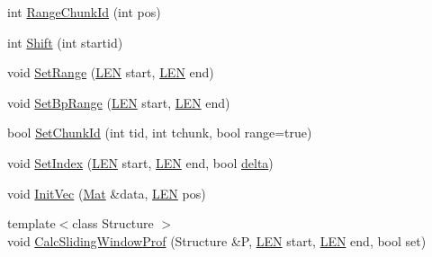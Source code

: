 \begin{DoxyCompactItemize}
int \hyperlink{class_rfold_1_1_paraso_r_ac14656436548df4306ef387bda5a0152}{Range\+Chunk\+Id} (int pos)
\item 
int \hyperlink{class_rfold_1_1_paraso_r_ac3515afcf36abba4a21548172138a784}{Shift} (int startid)
\item 
void \hyperlink{class_rfold_1_1_paraso_r_a84862289410d1791da040db720a4b4fa}{Set\+Range} (\hyperlink{energy__const_8hh_a05b49c662c073f89e86804f7856622a0}{L\+E\+N} start, \hyperlink{energy__const_8hh_a05b49c662c073f89e86804f7856622a0}{L\+E\+N} end)
\item 
void \hyperlink{class_rfold_1_1_paraso_r_a957949c0106b4f407f721c276495f36f}{Set\+Bp\+Range} (\hyperlink{energy__const_8hh_a05b49c662c073f89e86804f7856622a0}{L\+E\+N} start, \hyperlink{energy__const_8hh_a05b49c662c073f89e86804f7856622a0}{L\+E\+N} end)
\item 
bool \hyperlink{class_rfold_1_1_paraso_r_afffab65a875eb42915009928f9870fde}{Set\+Chunk\+Id} (int tid, int tchunk, bool range=true)
\item 
void \hyperlink{class_rfold_1_1_paraso_r_addc6e9ff9659c735a726cf78e2a5005e}{Set\+Index} (\hyperlink{energy__const_8hh_a05b49c662c073f89e86804f7856622a0}{L\+E\+N} start, \hyperlink{energy__const_8hh_a05b49c662c073f89e86804f7856622a0}{L\+E\+N} end, bool \hyperlink{class_rfold_1_1_paraso_r_ac0a808250ee05c1f56b5be32d867f11e}{delta})
\item 
void \hyperlink{class_rfold_1_1_paraso_r_a8d5e46c0bed60e2732c7c8417d4a8e56}{Init\+Vec} (\hyperlink{namespace_rfold_a6392dbfbc164230455fdcdb1a0ff53d7}{Mat} \&data, \hyperlink{energy__const_8hh_a05b49c662c073f89e86804f7856622a0}{L\+E\+N} pos)
\item 
{\footnotesize template$<$class Structure $>$ }\\void \hyperlink{class_rfold_1_1_paraso_r_a9ab821464d8b2d99e1923270b79a1851}{Calc\+Sliding\+Window\+Prof} (Structure \&P, \hyperlink{energy__const_8hh_a05b49c662c073f89e86804f7856622a0}{L\+E\+N} start, \hyperlink{energy__const_8hh_a05b49c662c073f89e86804f7856622a0}{L\+E\+N} end, bool set)
\end{DoxyCompactItemize}
